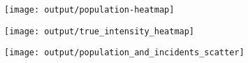     \centering
    \begin{subfigure}[t]{0.32\textwidth}
    \texttt{[image: output/population-heatmap]}
    \end{subfigure}
    \begin{subfigure}[t]{0.32\textwidth}
    \texttt{[image: output/true\_intensity\_heatmap]}
    \end{subfigure}%
    \begin{subfigure}[t]{0.32\textwidth}
    \texttt{[image: output/population\_and\_incidents\_scatter]}
    \end{subfigure}%
